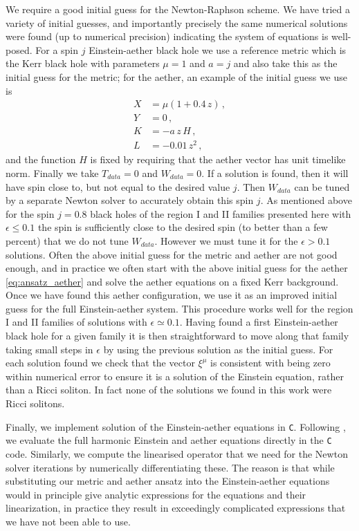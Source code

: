 \documentclass[12pt]{article}
\numberwithin{equation}{section}
\begin{document}
We require a good initial guess for the Newton-Raphson scheme. We have tried a variety of initial guesses, and importantly precisely the same numerical solutions were found (up to numerical precision) indicating the system of equations is well-posed.
For a spin $j$ Einstein-aether black hole we use a reference metric which is the Kerr black hole with parameters $\mu=1$ and $a=j$ and also take this as the initial guess for the metric; for the aether, an example of the initial guess we use is
\begin{equation}
\begin{aligned}
    X &=\mu(1+0.4\,z)\,,\\
    Y &= 0\,,\\
    K &= -a\,z\,H\,,\\
    L &=-0.01\,z^2\,,
\end{aligned}
\label{eq:ansatz_aether}
\end{equation}
and the function $H$ is fixed by requiring that the aether vector has unit timelike norm.
Finally we take $T_{data} = 0$ and $W_{data} = 0$. If a solution is found, then it will have spin close to, but not equal to the desired value $j$. Then $W_{data}$ can be tuned by a separate Newton solver to accurately obtain this spin $j$.
As mentioned above for the spin $j = 0.8$ black holes of the region I and II families presented here with $\epsilon \le 0.1$ the spin is sufficiently close to the desired spin (to better than a few percent) that we do not tune $W_{data}$. However we must tune it for the $\epsilon > 0.1$ solutions.
Often the above initial guess for the metric and aether are not good enough, and 
in practice we often start with the above initial guess for the aether \eqref{eq:ansatz_aether} and solve the aether equations on a fixed Kerr background. Once we have found this aether configuration, we use it as an improved initial guess for the full Einstein-aether system. This procedure works well for the region I and II families of solutions with $\epsilon \simeq 0.1$. Having found a first Einstein-aether black hole for a given family it is then straightforward to  move along that family taking small steps in $\epsilon$ by using the previous solution as the initial guess.    
For each solution found we check that the vector $\xi^\mu$ is consistent with being zero within numerical error to ensure it is a solution of the Einstein equation, rather than a Ricci soliton. In fact none of the solutions we found in this work were Ricci solitons. 

Finally, we implement solution of the  Einstein-aether equations in {\tt C}.
Following \cite{Figueras:2012rb}, we evaluate the full harmonic Einstein and aether equations directly in the {\tt C} code. Similarly, we compute the linearised operator that we need for the Newton solver iterations by numerically differentiating these. The reason is that 
while substituting our metric and aether ansatz into the Einstein-aether equations would in principle give analytic expressions for the equations and their linearization, in practice they result in exceedingly complicated expressions that we have not been able to use.




\newpage
{

\footnotesize

}

\end{document}
